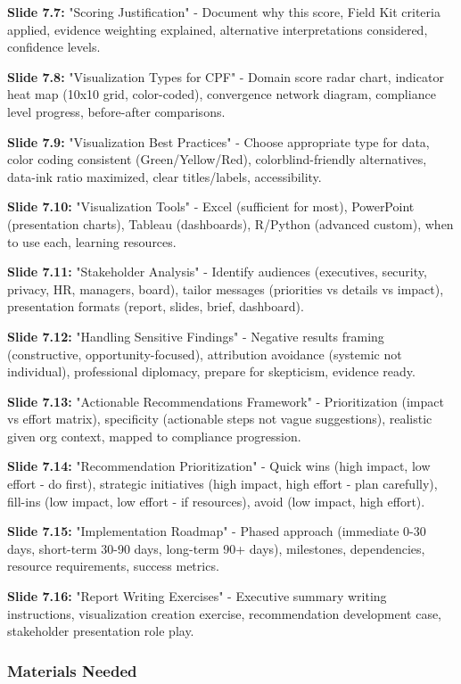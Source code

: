 \documentclass[11pt,a4paper]{article}
\begin{document}
\textbf{Slide 7.7:} "Scoring Justification" - Document why this score, Field Kit criteria applied, evidence weighting explained, alternative interpretations considered, confidence levels.

\textbf{Slide 7.8:} "Visualization Types for CPF" - Domain score radar chart, indicator heat map (10x10 grid, color-coded), convergence network diagram, compliance level progress, before-after comparisons.

\textbf{Slide 7.9:} "Visualization Best Practices" - Choose appropriate type for data, color coding consistent (Green/Yellow/Red), colorblind-friendly alternatives, data-ink ratio maximized, clear titles/labels, accessibility.

\textbf{Slide 7.10:} "Visualization Tools" - Excel (sufficient for most), PowerPoint (presentation charts), Tableau (dashboards), R/Python (advanced custom), when to use each, learning resources.

\textbf{Slide 7.11:} "Stakeholder Analysis" - Identify audiences (executives, security, privacy, HR, managers, board), tailor messages (priorities vs details vs impact), presentation formats (report, slides, brief, dashboard).

\textbf{Slide 7.12:} "Handling Sensitive Findings" - Negative results framing (constructive, opportunity-focused), attribution avoidance (systemic not individual), professional diplomacy, prepare for skepticism, evidence ready.

\textbf{Slide 7.13:} "Actionable Recommendations Framework" - Prioritization (impact vs effort matrix), specificity (actionable steps not vague suggestions), realistic given org context, mapped to compliance progression.

\textbf{Slide 7.14:} "Recommendation Prioritization" - Quick wins (high impact, low effort - do first), strategic initiatives (high impact, high effort - plan carefully), fill-ins (low impact, low effort - if resources), avoid (low impact, high effort).

\textbf{Slide 7.15:} "Implementation Roadmap" - Phased approach (immediate 0-30 days, short-term 30-90 days, long-term 90+ days), milestones, dependencies, resource requirements, success metrics.

\textbf{Slide 7.16:} "Report Writing Exercises" - Executive summary writing instructions, visualization creation exercise, recommendation development case, stakeholder presentation role play.

\subsubsection{Materials Needed}
\end{document}
